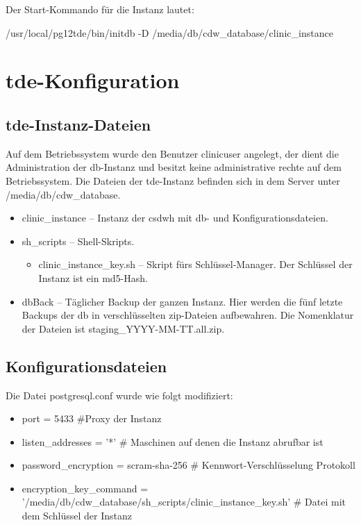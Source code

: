     Der Start-Kommando für die Instanz lautet: 
    
    /usr/local/pg12tde/bin/initdb -D /media/db/cdw\_database/clinic\_instance
    

	\section{\acs{tde}-Konfiguration} 
	
    \subsection{\acs{tde}-Instanz-Dateien}
    Auf dem Betriebssystem wurde den Benutzer clinicuser angelegt, der dient die Administration der \ac{db}-Instanz und besitzt keine administrative rechte auf dem Betriebssystem.
    Die Dateien der \ac{tde}-Instanz befinden sich in dem Server unter \textsf{/media/db/cdw\_database}.
    \begin{itemize}
    	\item \textsf{clinic\_instance} -- Instanz der \ac{csdwh} mit \ac{db}- und Konfigurationsdateien.
    	\item \textsf{sh\_scripts} -- Shell-Skripts.
    	\begin{itemize}
           \item \textsf{clinic\_instance\_key.sh} -- Skript fürs Schlüssel-Manager. Der Schlüssel der Instanz ist ein \ac{md5}-Hash.
    	\end{itemize}
    	\item \textsf{dbBack} -- Täglicher Backup der ganzen Instanz. Hier werden die fünf letzte Backups der \ac{db} in verschlüsselten \ac{zip}-Dateien aufbewahren. Die Nomenklatur der Dateien ist \textsf{staging\_YYYY-MM-TT.all.zip}.
    \end{itemize}

    \subsection{Konfigurationsdateien}
    Die Datei \textsf{postgresql.conf} wurde wie folgt modifiziert:
    \begin{itemize}
    	\item \textsf{port = 5433} \#Proxy der Instanz
    	\item \textsf{listen\_addresses = '*'} \# Maschinen auf denen die Instanz abrufbar ist
    	\item \textsf{password\_encryption = scram-sha-256} \# Kennwort-Verschlüsselung Protokoll
    	\item \textsf{encryption\_key\_command = '/media/db/cdw\_database/sh\_scripts/clinic\_instance\_key.sh'} \# Datei mit dem Schlüssel der Instanz
    \end{itemize}

